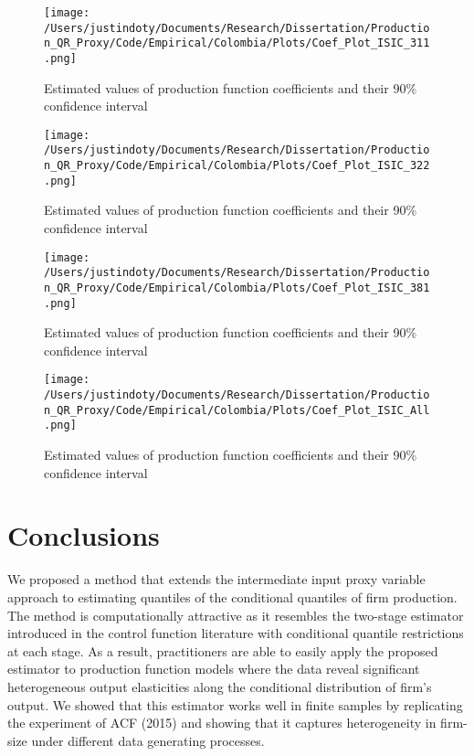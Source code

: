 \documentclass[11pt]{article}
\begin{document}



\begin{figure}[H]
\centering
\caption{Estimated values of production function coefficients and their 90\% confidence interval}
\texttt{[image: /Users/justindoty/Documents/Research/Dissertation/Production\_QR\_Proxy/Code/Empirical/Colombia/Plots/Coef\_Plot\_ISIC\_311.png]}
\end{figure}

\begin{figure}[H]
\centering
\caption{Estimated values of production function coefficients and their 90\% confidence interval}
\texttt{[image: /Users/justindoty/Documents/Research/Dissertation/Production\_QR\_Proxy/Code/Empirical/Colombia/Plots/Coef\_Plot\_ISIC\_322.png]}
\end{figure}

\begin{figure}[H]
\centering
\caption{Estimated values of production function coefficients and their 90\% confidence interval}
\texttt{[image: /Users/justindoty/Documents/Research/Dissertation/Production\_QR\_Proxy/Code/Empirical/Colombia/Plots/Coef\_Plot\_ISIC\_381.png]}
\end{figure}

\begin{figure}[H]
\centering
\caption{Estimated values of production function coefficients and their 90\% confidence interval}
\texttt{[image: /Users/justindoty/Documents/Research/Dissertation/Production\_QR\_Proxy/Code/Empirical/Colombia/Plots/Coef\_Plot\_ISIC\_All.png]}
\end{figure}

\section{Conclusions}

We proposed a method that extends the intermediate input proxy variable approach to estimating quantiles of the conditional quantiles of firm production. The method is computationally attractive as it resembles the two-stage estimator introduced in the control function literature with conditional quantile restrictions at each stage. As a result, practitioners are able to easily apply the proposed estimator to production function models where the data reveal significant heterogeneous output elasticities along the conditional distribution of firm's output. We showed that this estimator works well in finite samples by replicating the experiment of ACF (2015) and showing that it captures heterogeneity in firm-size under different data generating processes.  
\end{document}
